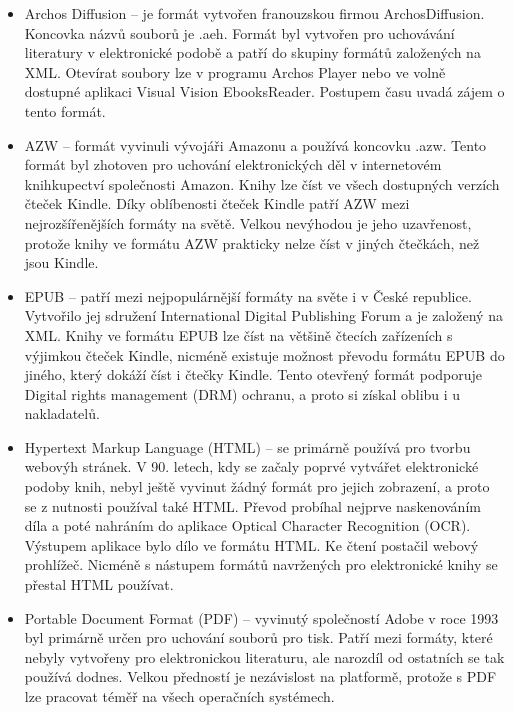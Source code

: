            \begin{itemize}
                \item Archos Diffusion – je formát vytvořen franouzskou firmou  ArchosDiffusion. Koncovka názvů souborů je .aeh. Formát byl vytvořen pro uchovávání literatury v elektronické podobě a patří do skupiny formátů založených na XML. Otevírat soubory lze v programu Archos Player nebo ve volně dostupné aplikaci Visual Vision EbooksReader. Postupem času uvadá zájem o tento formát.
                
                \item AZW – formát vyvinuli vývojáři Amazonu a používá koncovku .azw. Tento formát byl zhotoven pro uchování elektronických děl v internetovém knihkupectví společnosti Amazon. Knihy lze číst ve všech dostupných verzích čteček Kindle. Díky oblíbenosti čteček Kindle patří AZW mezi nejrozšířenějších formáty na světě. Velkou nevýhodou je jeho uzavřenost, protože knihy ve formátu AZW prakticky nelze číst v jiných čtečkách, než jsou Kindle.
                
                \item EPUB – patří mezi nejpopulárnější formáty na světe i v České republice. Vytvořilo jej sdružení International Digital Publishing Forum a je založený na XML. Knihy ve formátu EPUB lze číst na většině čtecích zařízeních s výjimkou čteček Kindle, nicméně existuje možnost převodu formátu EPUB do jiného, který dokáží číst i čtečky Kindle. Tento otevřený formát podporuje Digital rights management (DRM) ochranu, a proto si získal oblibu i u nakladatelů.
                
                \item Hypertext Markup Language (HTML) – se primárně používá pro tvorbu webovýh stránek. V 90. letech, kdy se začaly poprvé vytvářet elektronické podoby knih, nebyl ještě vyvinut žádný formát pro jejich zobrazení, a proto se z nutnosti používal také HTML. Převod probíhal nejprve naskenováním díla a poté nahráním do aplikace Optical Character Recognition (OCR). Výstupem aplikace bylo dílo ve formátu HTML. Ke čtení postačil webový prohlížeč. Nicméně s nástupem formátů navržených pro elektronické knihy se přestal HTML používat.
                
                \item Portable Document Format (PDF) – vyvinutý společností Adobe v roce 1993 byl primárně určen pro uchování souborů pro tisk. Patří mezi formáty, které nebyly vytvořeny pro elektronickou literaturu, ale narozdíl od ostatních se tak používá dodnes. Velkou předností je nezávislost na platformě, protože s PDF lze pracovat téměř na všech operačních systémech. 
                

\end{itemize}
